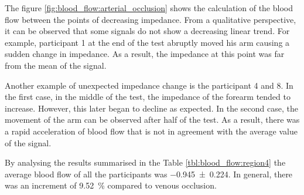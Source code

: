 The figure \ref{fig:blood_flow:arterial_occlusion} shows the calculation of the blood flow between the points of decreasing impedance. From a qualitative perspective, it can be observed that some signals do not show a decreasing linear trend. For example, participant 1 at the end of the test abruptly moved his arm causing a sudden change in impedance. As a result, the impedance at this point was far from the mean of the signal.

Another example of unexpected impedance change is the participant 4 and 8. In the first case, in the middle of the test, the impedance of the forearm tended to increase. However, this later began to decline as expected. In the second case, the movement of the arm can be observed after half of the test. As a result, there was a rapid acceleration of blood flow that is not in agreement with the average value of the signal.

By analysing the results summarised in the Table \ref{tbl:blood_flow:region4} the average blood flow of all the participants was \SI{-0.945(0224)}{\bfv}. In general, there was an increment of \SI{9.52}{\percent} compared to venous occlusion. 


